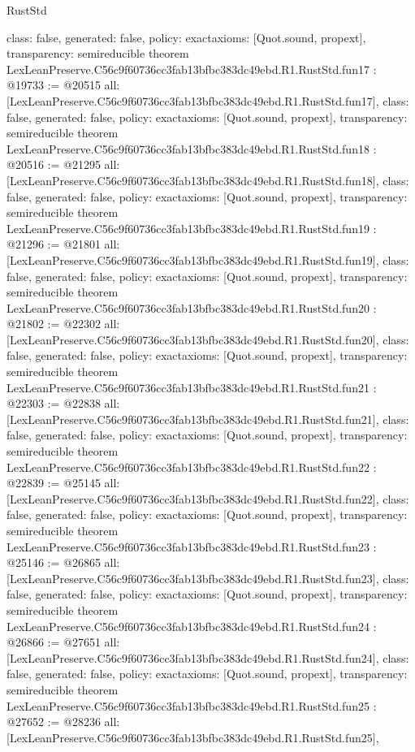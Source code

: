 \begin{lexlean}{RustStd}
\begin{coremodule}
{  class: false,
  generated: false,
  policy: exact{axioms: [Quot.sound, propext]},
  transparency: semireducible
}
theorem LexLeanPreserve.C56c9f60736cc3fab13bfbc383dc49ebd.R1.RustStd.fun17 : @19733 := @20515 {
  all: [LexLeanPreserve.C56c9f60736cc3fab13bfbc383dc49ebd.R1.RustStd.fun17],
  class: false,
  generated: false,
  policy: exact{axioms: [Quot.sound, propext]},
  transparency: semireducible
}
theorem LexLeanPreserve.C56c9f60736cc3fab13bfbc383dc49ebd.R1.RustStd.fun18 : @20516 := @21295 {
  all: [LexLeanPreserve.C56c9f60736cc3fab13bfbc383dc49ebd.R1.RustStd.fun18],
  class: false,
  generated: false,
  policy: exact{axioms: [Quot.sound, propext]},
  transparency: semireducible
}
theorem LexLeanPreserve.C56c9f60736cc3fab13bfbc383dc49ebd.R1.RustStd.fun19 : @21296 := @21801 {
  all: [LexLeanPreserve.C56c9f60736cc3fab13bfbc383dc49ebd.R1.RustStd.fun19],
  class: false,
  generated: false,
  policy: exact{axioms: [Quot.sound, propext]},
  transparency: semireducible
}
theorem LexLeanPreserve.C56c9f60736cc3fab13bfbc383dc49ebd.R1.RustStd.fun20 : @21802 := @22302 {
  all: [LexLeanPreserve.C56c9f60736cc3fab13bfbc383dc49ebd.R1.RustStd.fun20],
  class: false,
  generated: false,
  policy: exact{axioms: [Quot.sound, propext]},
  transparency: semireducible
}
theorem LexLeanPreserve.C56c9f60736cc3fab13bfbc383dc49ebd.R1.RustStd.fun21 : @22303 := @22838 {
  all: [LexLeanPreserve.C56c9f60736cc3fab13bfbc383dc49ebd.R1.RustStd.fun21],
  class: false,
  generated: false,
  policy: exact{axioms: [Quot.sound, propext]},
  transparency: semireducible
}
theorem LexLeanPreserve.C56c9f60736cc3fab13bfbc383dc49ebd.R1.RustStd.fun22 : @22839 := @25145 {
  all: [LexLeanPreserve.C56c9f60736cc3fab13bfbc383dc49ebd.R1.RustStd.fun22],
  class: false,
  generated: false,
  policy: exact{axioms: [Quot.sound, propext]},
  transparency: semireducible
}
theorem LexLeanPreserve.C56c9f60736cc3fab13bfbc383dc49ebd.R1.RustStd.fun23 : @25146 := @26865 {
  all: [LexLeanPreserve.C56c9f60736cc3fab13bfbc383dc49ebd.R1.RustStd.fun23],
  class: false,
  generated: false,
  policy: exact{axioms: [Quot.sound, propext]},
  transparency: semireducible
}
theorem LexLeanPreserve.C56c9f60736cc3fab13bfbc383dc49ebd.R1.RustStd.fun24 : @26866 := @27651 {
  all: [LexLeanPreserve.C56c9f60736cc3fab13bfbc383dc49ebd.R1.RustStd.fun24],
  class: false,
  generated: false,
  policy: exact{axioms: [Quot.sound, propext]},
  transparency: semireducible
}
theorem LexLeanPreserve.C56c9f60736cc3fab13bfbc383dc49ebd.R1.RustStd.fun25 : @27652 := @28236 {
  all: [LexLeanPreserve.C56c9f60736cc3fab13bfbc383dc49ebd.R1.RustStd.fun25],
}
\end{coremodule}
\end{lexlean}
